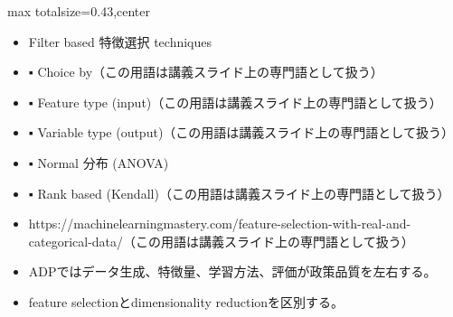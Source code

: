 \clearpage
{}
\begin{minipage}[t]{0.405\textwidth}
\begin{adjustbox}{max totalsize={\textwidth}{0.43\textheight},center}
\begin{minipage}{\textwidth}\scriptsize
{}\begin{itemize}
\item Filter based 特徴選択 techniques
\item ▪ Choice by（この用語は講義スライド上の専門語として扱う）
\item ▪ Feature type (input)（この用語は講義スライド上の専門語として扱う）
\item ▪ Variable type (output)（この用語は講義スライド上の専門語として扱う）
\item ▪ Normal 分布 (ANOVA)
\item ▪ Rank based (Kendall)（この用語は講義スライド上の専門語として扱う）
\item https://machinelearningmastery.com/feature-selection-with-real-and-categorical-data/（この用語は講義スライド上の専門語として扱う）
\end{itemize}\begin{itemize}
\item ADPではデータ生成、特徴量、学習方法、評価が政策品質を左右する。
\item feature selectionとdimensionality reductionを区別する。
\end{itemize}
\end{minipage}
\end{adjustbox}
\end{minipage}\hfill
